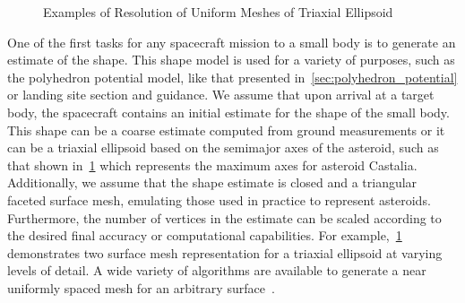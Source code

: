 \documentclass[letterpaper, paper,11pt]{AAS}		%
\begin{document}
\begin{figure}[htbp]
    \centering
    \caption{Examples of Resolution of Uniform Meshes of Triaxial Ellipsoid~\label{fig:uniform_mesh}}
\end{figure}

One of the first tasks for any spacecraft mission to a small body is to generate an estimate of the shape.
This shape model is used for a variety of purposes, such as the polyhedron potential model, like that presented in~\cref{sec:polyhedron_potential} or landing site section and guidance.
We assume that upon arrival at a target body, the spacecraft contains an initial estimate for the shape of the small body.
This shape can be a coarse estimate computed from ground measurements or it can be a triaxial ellipsoid based on the semimajor axes of the asteroid, such as that shown in~\cref{fig:uniform_mesh} which represents the maximum axes for asteroid Castalia.
Additionally, we assume that the shape estimate is closed and a triangular faceted surface mesh, emulating those used in practice to represent asteroids.
Furthermore, the number of vertices in the estimate can be scaled according to the desired final accuracy or computational capabilities.
For example,~\cref{fig:uniform_mesh} demonstrates two surface mesh representation for a triaxial ellipsoid at varying levels of detail. 
A wide variety of algorithms are available to generate a near uniformly spaced mesh for an arbitrary surface~\cite{persson2004,boissonnat2005}.
\end{document}
